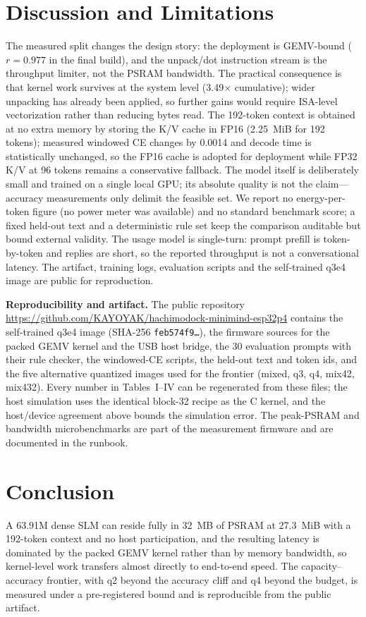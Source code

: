 \documentclass[journal,letterpaper]{IEEEtran}
\begin{document}
\section{Discussion and Limitations}
The measured split changes the design story: the deployment is GEMV-bound ($r=0.977$ in the
final build), and the unpack/dot instruction stream is the throughput limiter, not the PSRAM
bandwidth. The practical consequence is that kernel work survives at the system level
(3.49$\times$ cumulative); wider unpacking has already been applied, so further gains would
require ISA-level vectorization rather than reducing bytes read. The 192-token context is obtained at no extra memory by storing the K/V cache in FP16
(2.25~MiB for 192 tokens); measured windowed CE changes by 0.0014 and decode time is
statistically unchanged, so the FP16 cache is adopted for deployment while FP32 K/V at 96
tokens remains a conservative fallback. The model itself is deliberately small and trained on a single local GPU; its absolute
quality is not the claim---accuracy measurements only delimit the feasible set. We report no
energy-per-token figure (no power meter was available) and no standard benchmark score; a fixed
held-out text and a deterministic rule set keep the comparison auditable but bound external
validity. The usage model is single-turn: prompt prefill is token-by-token and replies are
short, so the reported throughput is not a conversational latency. The artifact,
training logs, evaluation scripts and the self-trained q3e4 image are public for reproduction.

\textbf{Reproducibility and artifact.} The public repository \url{https://github.com/KAYOYAK/hachimodock-minimind-esp32p4} contains the self-trained q3e4 image
(SHA-256 \texttt{feb574f9\ldots}), the firmware sources for the packed GEMV kernel and the USB
host bridge, the 30 evaluation prompts with their rule checker, the windowed-CE scripts, the
held-out text and token ids, and the five alternative quantized images used for the frontier
(mixed, q3, q4, mix42, mix432). Every number in Tables~I--IV can be regenerated from these
files; the host simulation uses the identical block-32 recipe as the C kernel, and the
host/device agreement above bounds the simulation error. The peak-PSRAM and bandwidth
microbenchmarks are part of the measurement firmware and are documented in the runbook.

\section{Conclusion}
A 63.91M dense SLM can reside fully in 32~MB of PSRAM at 27.3~MiB with a 192-token context and
no host participation, and the resulting latency is dominated by the packed GEMV kernel rather
than by memory bandwidth, so kernel-level work transfers almost directly to end-to-end speed.
The capacity--accuracy frontier, with q2 beyond the accuracy cliff and q4 beyond the budget, is
measured under a pre-registered bound and is reproducible from the public artifact.
\end{document}
